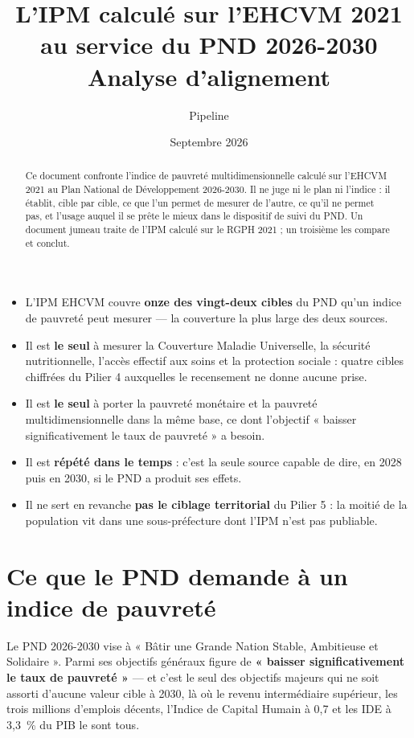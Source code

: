 \documentclass[11pt,a4paper]{article}
\title{\bfseries L'IPM calculé sur l'EHCVM 2021 au service du PND 2026-2030\\[4pt]
\large Analyse d'alignement}
\author{Pipeline \col{PythonIPM}}
\date{Septembre 2026}
\begin{document}
\maketitle

\begin{abstract}
\noindent Ce document confronte l'indice de pauvreté multidimensionnelle calculé sur l'EHCVM 2021
au Plan National de Développement 2026-2030. Il ne juge ni le plan ni l'indice : il établit, cible
par cible, ce que l'un permet de mesurer de l'autre, ce qu'il ne permet pas, et l'usage auquel il
se prête le mieux dans le dispositif de suivi du PND. Un document jumeau traite de l'IPM calculé
sur le RGPH 2021 ; un troisième les compare et conclut.
\end{abstract}

\begin{retenir}
\begin{itemize}
  \item L'IPM EHCVM couvre \textbf{onze des vingt-deux cibles} du PND qu'un indice de pauvreté
        peut mesurer --- la couverture la plus large des deux sources.
  \item Il est \textbf{le seul} à mesurer la Couverture Maladie Universelle, la sécurité
        nutritionnelle, l'accès effectif aux soins et la protection sociale : quatre cibles
        chiffrées du Pilier 4 auxquelles le recensement ne donne aucune prise.
  \item Il est \textbf{le seul} à porter la pauvreté monétaire et la pauvreté multidimensionnelle
        dans la même base, ce dont l'objectif « baisser significativement le taux de pauvreté » a
        besoin.
  \item Il est \textbf{répété dans le temps} : c'est la seule source capable de dire, en 2028 puis
        en 2030, si le PND a produit ses effets.
  \item Il ne sert en revanche \textbf{pas le ciblage territorial} du Pilier 5 : la moitié de la
        population vit dans une sous-préfecture dont l'IPM n'est pas publiable.
\end{itemize}
\end{retenir}

\tableofcontents
\bigskip

\section{Ce que le PND demande à un indice de pauvreté}

Le PND 2026-2030 vise à « Bâtir une Grande Nation Stable, Ambitieuse et Solidaire ». Parmi ses
objectifs généraux figure de \textbf{« baisser significativement le taux de pauvreté »} --- et
c'est le seul des objectifs majeurs qui ne soit assorti d'aucune valeur cible à 2030, là où le
revenu intermédiaire supérieur, les trois millions d'emplois décents, l'Indice de Capital Humain à
0,7 et les IDE à 3,3~\% du PIB le sont tous.
\end{document}
